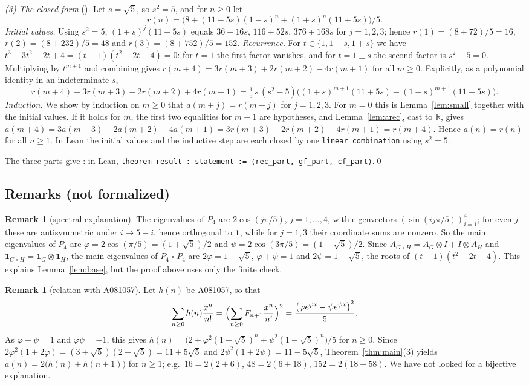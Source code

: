 \documentclass[11pt]{amsart}
\theoremstyle{plain}
\theoremstyle{definition}
\newtheorem{remark}[theorem]{Remark}
\newcommand{\R}{\mathbb{R}}
\newcommand{\one}{\mathbf{1}}
\newcommand{\sq}{\mathbin{\square}}
\begin{document}
\emph{(3) The closed form} (). Let $s=\sqrt5$, so $s^2=5$, and for $n\ge0$ let
\[
  r(n)=\bigl(8+(11-5s)(1-s)^n+(1+s)^n(11+5s)\bigr)/5.
\]
\emph{Initial values.} Using $s^2=5$, $(1\mp s)^j(11\mp5s)$ equals $36\mp16s$, $116\mp52s$, $376\mp168s$ for $j=1,2,3$; hence $r(1)=(8+72)/5=16$, $r(2)=(8+232)/5=48$ and $r(3)=(8+752)/5=152$.
\emph{Recurrence.} For $t\in\{1,1-s,1+s\}$ we have $t^3-3t^2-2t+4=(t-1)(t^2-2t-4)=0$: for $t=1$ the first factor vanishes, and for $t=1\pm s$ the second factor is $s^2-5=0$. Multiplying by $t^{m+1}$ and combining gives $r(m+4)=3r(m+3)+2r(m+2)-4r(m+1)$ for all $m\ge0$. Explicitly, as a polynomial identity in an indeterminate $s$,
\[
  r(m+4)-3r(m+3)-2r(m+2)+4r(m+1)=\tfrac{1}{5}\,s\,(s^2-5)\bigl((1+s)^{m+1}(11+5s)-(1-s)^{m+1}(11-5s)\bigr).
\]
\emph{Induction.} We show by induction on $m\ge0$ that $a(m+j)=r(m+j)$ for $j=1,2,3$. For $m=0$ this is Lemma~\ref{lem:small} together with the initial values. If it holds for $m$, the first two equalities for $m+1$ are hypotheses, and Lemma~\ref{lem:arec}, cast to $\R$, gives
$a(m+4)=3a(m+3)+2a(m+2)-4a(m+1)=3r(m+3)+2r(m+2)-4r(m+1)=r(m+4)$.
Hence $a(n)=r(n)$ for all $n\ge1$. In Lean the initial values and the inductive step are each closed by one \texttt{linear\_combination} using $s^2=5$.

The three parts give : in Lean, \texttt{theorem result : statement := ⟨rec\_part, gf\_part, cf\_part⟩}.\qed

\subsection{Remarks (not formalized)}

\begin{remark}[spectral explanation]\label{rem:spectral}
The eigenvalues of $P_4$ are $2\cos(j\pi/5)$, $j=1,\dots,4$, with eigenvectors $(\sin(ij\pi/5))_{i=1}^4$; for even $j$ these are antisymmetric under $i\mapsto5-i$, hence orthogonal to $\one$, while for $j=1,3$ their coordinate sums are nonzero. So the main eigenvalues of $P_4$ are $\varphi=2\cos(\pi/5)=(1+\sqrt5)/2$ and $\psi=2\cos(3\pi/5)=(1-\sqrt5)/2$. Since $A_{G\sq H}=A_G\otimes I+I\otimes A_H$ and $\one_{G\sq H}=\one_G\otimes\one_H$, the main eigenvalues of $P_4\sq P_4$ are $2\varphi=1+\sqrt5$, $\varphi+\psi=1$ and $2\psi=1-\sqrt5$, the roots of $(t-1)(t^2-2t-4)$. This explains Lemma~\ref{lem:base}, but the proof above uses only the finite check.
\end{remark}

\begin{remark}[relation with A081057]\label{rem:A081057}
Let $h(n)$ be A081057, so that
\[
  \sum_{n\ge0}h(n)\frac{x^n}{n!}=\Bigl(\sum_{n\ge0}F_{n+1}\frac{x^n}{n!}\Bigr)^2=\frac{\bigl(\varphi e^{\varphi x}-\psi e^{\psi x}\bigr)^2}{5}.
\]
As $\varphi+\psi=1$ and $\varphi\psi=-1$, this gives $h(n)=\bigl(2+\varphi^2(1+\sqrt5)^n+\psi^2(1-\sqrt5)^n\bigr)/5$ for $n\ge0$. Since $2\varphi^2(1+2\varphi)=(3+\sqrt5)(2+\sqrt5)=11+5\sqrt5$ and $2\psi^2(1+2\psi)=11-5\sqrt5$, Theorem~\ref{thm:main}(3) yields
$a(n)=2\bigl(h(n)+h(n+1)\bigr)$ for $n\ge1$; e.g.\ $16=2(2+6)$, $48=2(6+18)$, $152=2(18+58)$. We have not looked for a bijective explanation.
\end{remark}
\end{document}
